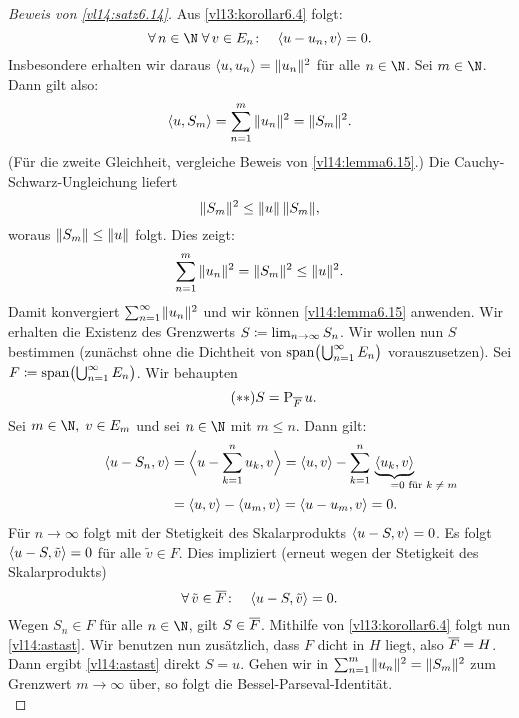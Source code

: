 \begin{proof}[Beweis von \cref{vl14:satz6.14}]
    Aus \cref{vl13:korollar6.4} folgt:
    \[ \forall\,n\in\N\;\forall\, v\in E_n\colon\quad
        \SP{u-u_n, v} = 0
    . \]
    Insbesondere erhalten wir daraus $\SP{u,u_n} = \norm{u_n}^2$ für alle
    $n\in\N$. Sei $m\in\N$. Dann gilt also:
    \[ \SP{u, S_m} = \nsum^m \, \norm{u_n}^2 = \norm{S_m}^2  . \]
    (Für die zweite Gleichheit, vergleiche Beweis von
    \cref{vl14:lemma6.15}.)
    Die Cauchy-Schwarz-Ungleichung  liefert
    \[ \lVert S_m\rVert^2  \leq \lVert u\rVert \, \lVert S_m\rVert  , \]
    woraus $\lVert S_m\rVert \leq \lVert u\rVert$ folgt. Dies zeigt:
    \[ \sum_{n=1}^m \, \lVert u_n\rVert^2 = \lVert S_m\rVert^2 \leq \lVert u\rVert^2  . \]
    Damit konvergiert $\sum_{n=1}^\infty \mkern1mu \lVert u_n\rVert^2$ und wir können
    \cref{vl14:lemma6.15} anwenden. Wir erhalten die Existenz des Grenzwerts
    $S \coloneqq \lim_{n\to\infty} S_n$. Wir wollen nun $S$ bestimmen (zunächst
    ohne die Dichtheit von $\operatorname{span}\bigl(\mkern1mu\bigcup_{n=1}^\infty E_n\bigr)$
    vorauszusetzen).
    Sei $F \coloneqq \operatorname{span}\bigl(\bigcup_{n=1}^\infty E_n\bigr)$. Wir behaupten
    \[ \tag{$\ast\ast$} \label{vl14:astast}
        S = \operatorname{P}_{\overline{F}} u 
    . \]
    Sei $m\in\N,\;v\in E_m$ und sei $n\in\N$ mit $m\leq n$. Dann gilt:
    \begin{align*}
        \SP{u-S_n, v} 
        &= \SPa[\Big]{u-\ksum^n u_k, v}
        = \SP{u,v} - \ksum^n \, \underbrace{\SP{u_k,v}}_{
            \;\; =0 \mathrlap{\text{ für $k\neq m$}}}
        \\
        &= \SP{u,v} - \SP{u_m,v} = \SP{u-u_m,v} = 0
    . \end{align*}
    Für $n\to\infty$ folgt mit der Stetigkeit des Skalarprodukts 
    $\SP{u-S,v} = 0$. Es folgt $\SP{u-S,\tilde v}=0$ für alle $\tilde v\in F$.
    Dies impliziert (erneut wegen der Stetigkeit des Skalarprodukts)
    \[ \forall\,\tilde v\in\setclosure{F}\colon\quad \SP{u-S,\tilde v} = 0  . \]
    Wegen $S_n\in F$ für alle $n\in\N$, gilt $S\in\overline{F}$. Mithilfe von
    \eqref{vl13:korollar6.4} folgt nun \eqref{vl14:astast}.
    Wir benutzen nun zusätzlich, dass $F$ dicht in $H$ liegt, also
    $\overline{F} = H$. Dann ergibt \eqref{vl14:astast} direkt $S=u$.
    Gehen wir in $\sum_{n=1}^m \mkern1mu \lVert u_n\rVert^2 = \lVert S_m\rVert^2$ zum Grenzwert
    $m\to\infty$ über, so folgt die Bessel-Parseval-Identität.
    \\
\end{proof}

